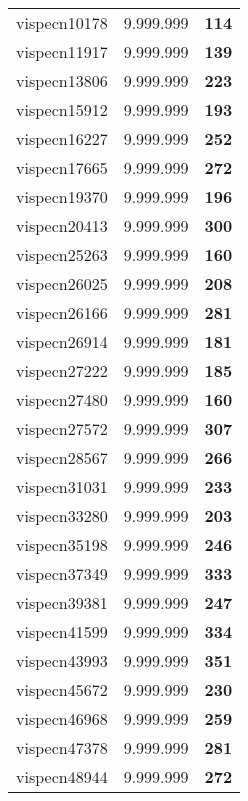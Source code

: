 \begin{tabular}{cc||c}
vispecn10178     & 9.999.999        & {\bf 114}       \\ 
vispecn11917     & 9.999.999        & {\bf 139}       \\ 
vispecn13806     & 9.999.999        & {\bf 223}       \\ 
vispecn15912     & 9.999.999        & {\bf 193}       \\ 
vispecn16227     & 9.999.999        & {\bf 252}       \\ 
vispecn17665     & 9.999.999        & {\bf 272}       \\ 
vispecn19370     & 9.999.999        & {\bf 196}       \\ 
vispecn20413     & 9.999.999        & {\bf 300}       \\ 
vispecn25263     & 9.999.999        & {\bf 160}       \\ 
vispecn26025     & 9.999.999        & {\bf 208}       \\ 
vispecn26166     & 9.999.999        & {\bf 281}       \\ 
vispecn26914     & 9.999.999        & {\bf 181}       \\ 
vispecn27222     & 9.999.999        & {\bf 185}       \\ 
vispecn27480     & 9.999.999        & {\bf 160}       \\ 
vispecn27572     & 9.999.999        & {\bf 307}       \\ 
vispecn28567     & 9.999.999        & {\bf 266}       \\ 
vispecn31031     & 9.999.999        & {\bf 233}       \\ 
vispecn33280     & 9.999.999        & {\bf 203}       \\ 
vispecn35198     & 9.999.999        & {\bf 246}       \\ 
vispecn37349     & 9.999.999        & {\bf 333}       \\ 
vispecn39381     & 9.999.999        & {\bf 247}       \\ 
vispecn41599     & 9.999.999        & {\bf 334}       \\ 
vispecn43993     & 9.999.999        & {\bf 351}       \\ 
vispecn45672     & 9.999.999        & {\bf 230}       \\ 
vispecn46968     & 9.999.999        & {\bf 259}       \\ 
vispecn47378     & 9.999.999        & {\bf 281}       \\ 
vispecn48944     & 9.999.999        & {\bf 272}       \\ 

\end{tabular}

